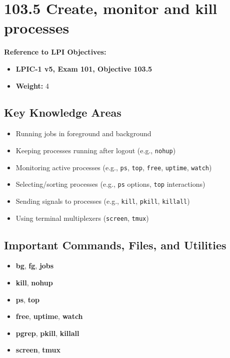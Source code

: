 \documentclass[a4paper]{report}
\begin{document}
\newpage
\section*{103.5 Create, monitor and kill processes}

\textbf{Reference to LPI Objectives:}
\begin{itemize}
    \item \textbf{LPIC-1 v5, Exam 101, Objective 103.5}
    \item \textbf{Weight:} 4
\end{itemize}

\subsection*{Key Knowledge Areas}
\begin{itemize}
    \item Running jobs in foreground and background
    \item Keeping processes running after logout (e.g., \texttt{nohup})
    \item Monitoring active processes (e.g., \texttt{ps}, \texttt{top}, \texttt{free}, \texttt{uptime}, \texttt{watch})
    \item Selecting/sorting processes (e.g., \texttt{ps} options, \texttt{top} interactions)
    \item Sending signals to processes (e.g., \texttt{kill}, \texttt{pkill}, \texttt{killall})
    \item Using terminal multiplexers (\texttt{screen}, \texttt{tmux})
\end{itemize}

\subsection*{Important Commands, Files, and Utilities}
\begin{itemize}
    \item \textbf{bg}, \textbf{fg}, \textbf{jobs}
    \item \textbf{kill}, \textbf{nohup}
    \item \textbf{ps}, \textbf{top}
    \item \textbf{free}, \textbf{uptime}, \textbf{watch}
    \item \textbf{pgrep}, \textbf{pkill}, \textbf{killall}
    \item \textbf{screen}, \textbf{tmux}
\end{itemize}
\end{document}
